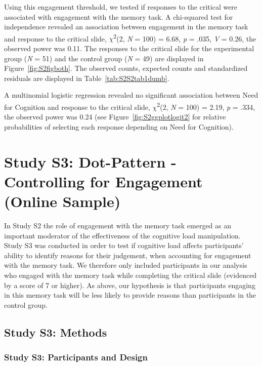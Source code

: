 \documentclass[
  american,
  man,floatsintext]{apa7}
\begin{document}
Using this engagement threshold, we tested if responses to the critical were associated with engagement with the memory task. A chi-squared test for independence revealed an association between engagement in the memory task and response to the critical slide, \(\chi\)\textsuperscript{2}(2, \emph{N} = 100) = 6.68, \emph{p} = .035, \emph{V} = 0.26, the observed power was 0.11. The responses to the critical slide for the experimental group (\emph{N} = 51) and the control group (\emph{N} = 49) are displayed in Figure~\ref{fig:S2figboth}. The observed counts, expected counts and standardized residuals are displayed in Table~\ref{tab:S2S2tab1dumb}.

A multinomial logistic regression revealed no significant association between Need for Cognition and response to the critical slide, \(\chi\)\textsuperscript{2}(2, \emph{N} = 100) = 2.19, \emph{p} = .334, the observed power was 0.24 (see Figure~\ref{fig:S2ggplotlogit2} for relative probabilities of selecting each response depending on Need for Cognition).

\newpage

\hypertarget{study-s3-dot-pattern---controlling-for-engagement-online-sample}{%
\section{Study S3: Dot-Pattern - Controlling for Engagement (Online Sample)}\label{study-s3-dot-pattern---controlling-for-engagement-online-sample}}

In Study S2 the role of engagement with the memory task emerged as an important moderator of the effectiveness of the cognitive load manipulation. Study S3 was conducted in order to test if cognitive load affects participants' ability to identify reasons for their judgement, when accounting for engagement with the memory task. We therefore only included participants in our analysis who engaged with the memory task while completing the critical slide (evidenced by a score of 7 or higher). As above, our hypothesis is that participants engaging in this memory task will be less likely to provide reasons than participants in the control group.

\hypertarget{study-s3-methods}{%
\subsection{Study S3: Methods}\label{study-s3-methods}}

\hypertarget{study-s3-participants-and-design}{%
\subsubsection{Study S3: Participants and Design}\label{study-s3-participants-and-design}}
\end{document}
